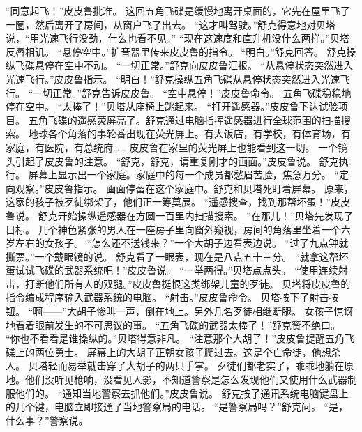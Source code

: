 \documentclass[a4paper,12pt,UTF8,twoside]{ctexbook}
\begin{document}
        “同意起飞！”皮皮鲁批准。 
        这回五角飞碟是缓慢地离开桌面的，它先在屋里飞了一圈，然后离开了房间，从窗户飞了出去。 
        “这才叫驾驶。”舒克得意地对贝塔说，“用光速飞行没劲，什么也看不见。” 
        “现在这速度和直升机没什么两样。”贝塔反唇相讥。 
        “悬停空中。”扩音器里传来皮皮鲁的指令。 
        “明白。”舒克回答。 
        舒克操纵飞碟悬停在空中不动。 
        “一切正常。”舒克向皮皮鲁汇报。 
        “从悬停状态突然进入光速飞行。”皮皮鲁指示。 
        “明白！”舒克操纵五角飞碟从悬停状态突然进入光速飞行。 
        “一切正常。”舒克告诉皮皮鲁。 
        “空中悬停！”皮皮鲁命令。 
        五角飞碟稳稳地停在空中。 
        “太棒了！”贝塔从座椅上跳起来。 
        “打开遥感器。”皮皮鲁下达试验项目。 
        五角飞碟的遥感荧屏亮了。舒克通过电脑指挥遥感器进行全球范围的扫描搜索。 
        地球各个角落的事轮番出现在荧光屏上。有大饭店，有学校，有体育场，有家庭，有医院，有总统府…… 
        皮皮鲁在家里的荧光屏上也能看到这一切。 
        一个镜头引起了皮皮鲁的注意。 
        “舒克，舒克，请重复刚才的画面。”皮皮鲁说。 
        舒克执行。 
        屏幕上显示出一个家庭。家庭中的每一个成员都愁眉苦脸，焦急万分。 
        “定向观察。”皮皮鲁指示。 
        画面停留在这个家庭中。舒克和贝塔死盯着屏幕。 
        原来，这家的孩子被歹徒绑架了，他们正一筹莫展。 
        “遥感搜查，找到那帮坏蛋！”皮皮鲁说。 
        舒克开始操纵遥感器在方圆一百里内扫描搜索。 
        “在那儿！”贝塔先发现了目标。 
        几个神色紧张的男人在一座房子里向窗外窥视，房间的角落里坐着一个六岁左右的女孩子。 
        “怎么还不送钱来？”一个大胡子边看表边说。 
        “过了九点钟就撕票。”一个戴眼镜的说。 
        舒克看了一眼表，现在是八点五十三分。 
        “就拿这帮坏蛋试试飞碟的武器系统吧！”皮皮鲁说。 
        “一举两得。”贝塔点点头。 
        “使用连续射击，打断他们所有人的双腿。”皮皮鲁挺恨这类绑架儿童的歹徒。 
        贝塔将皮皮鲁的指令编成程序输入武器系统的电脑。 
        “射击。”皮皮鲁命令。 
        贝塔按下了射击按钮。 
        “啊——”大胡子惨叫一声，倒在地上。另外几名歹徒相继断腿。 
        女孩子惊讶地看着眼前发生的不可思议的事。 
        “五角飞碟的武器太棒了！”舒克赞不绝口。 
        “你也不看看是谁操纵的。”贝塔得意非凡。 
        “注意那个大胡子！”皮皮鲁提醒五角飞碟上的两位勇士。 
        屏幕上的大胡子正朝女孩子爬过去。这是个亡命徒，他想杀人。 
        贝塔轻而易举就击穿了大胡子的两只手掌。 
        歹徒们都老实了，乖乖地躺在原地。他们没听见枪响，没看见人影，不知道警察是怎么发现他们又使用什么武器制服他们的。 
        “通知当地警察去抓他们。”皮皮鲁说。 
        舒克按了通讯系统电脑键盘上的几个键，电脑立即接通了当地警察局的电话。 
        “是警察局吗？”舒克问。 
        “是，什么事？”警察说。 
\end{document}
